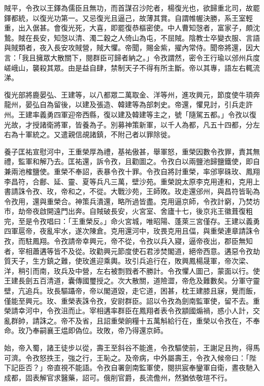 \begin{pinyinscope}
 賊平，令孜以王鐸為儒臣且無功，而首謀召沙陀者，楊復光也，欲歸重北司，故罷鐸都統，以復光功第一。又忌復光且逼己，故薄其賞。自謂帷幄決勝，系王室輕重，出入倨甚。會復光死，大喜，即罷復恭樞密使。中人曹知愨者，富家子，頗沈鷙。賊在長安，知愨以清、濁二穀之人倚山為屯，不屈賊。陰教士卒變衣服、言語與賊類者，夜入長安攻賊營，賊大懼。帝聞，賜金紫，擢內常侍。聞帝將還，因大言：「我且擁眾大散關下，閱群臣可歸者納之。」令孜謂然，密令王行瑜以邠州兵度嵯峨山，襲殺其眾。由是益自肆，禁制天子不得有所主斷。帝以其專，語左右輒流涕。



 復光部將鹿晏弘、王建等，以八都眾二萬取金、洋等州，進攻興元，節度使牛頊奔龍州，晏弘自為留後，以建及張造、韓建等為部刺史。帝還，懼見討，引兵走許州。王建率義勇四軍迎帝西縣，復以建及韓建等主之，號「隨駕五都。」令孜以復光故，才授諸衛將軍，皆養為子。別募神策新軍，以千人為都，凡五十四都，分左右為十軍統之。又遣親信覘諸鎮，不附己者以罪除徙。



 養子匡祐宣慰河中，王重榮厚為禮，基祐傲甚，舉軍怒，重榮因數令孜罪，責其無禮，監軍和解乃去。匡祐還，訴令孜，且勸圖之。令孜白以兩鹽池歸鹽鐵使，即自兼兩池榷鹽使。重榮不奉詔，表暴令孜十罪。令孜自將討重榮，率邠寧硃玫、鳳翔李昌符，合鄜、延、靈、夏等兵凡三萬，壁沙苑。重榮說太原李克用連和，克用上書請誅令孜、玫，帝和之，不從。大戰沙苑，王師敗。玫走還邠州，與昌符皆恥為令孜用，還與重榮合。神策兵潰還，略所過皆盡。克用逼京師，令孜計窮，乃焚坊市，劫帝夜啟開遠門出奔。自賊破長安，火宮室、舍廬十七，後京兆王徽葺復粗完，至是令孜唱曰：「王重榮反。」命火宮城，唯昭陽、蓬萊三宮僅存。王建以義勇四軍扈帝，夜亂牢水，遂次陳倉。克用還河中，玫畏克用且偪，與重榮連章請誅令孜，而駐鳳翔。令孜請帝幸興元，帝不從，令孜以兵入寢，逼帝夜出，郡臣無知者，宰相蕭遘等皆不及從。玫勸興元節度使石君涉焚閣道，絕帝西意。遘惡令孜劫質天子，生方鎮之難，使玫進迎乘輿。玫引兵追行在，敗興鳳楊晟軍，帝次梁、洋，稍引而南，玫兵及中營，左右被剽戮者不勝計。令孜懼人圖己，蒙面以行。使王建長劍五百清道，囊傳國璽授之。次大散關，道險澀，帝危及難數矣。分軍守靈壁，亢追兵。玫長驅躡帝，帝以閣道毀，走它道，困甚，枕王建膝且寐，覺而飯，僅能至興元。玫、重榮表誅令孜，安尉群臣。詔以令孜為劍南監軍使，留不去。重榮請幸河中，令孜沮而止。宰相遘率群臣在鳳翔者表令孜顓國煽禍，惑小人計，交亂群帥，請誅之。帝不及省，且詔重榮餉糧十五萬斛給行在，重榮以令孜在，不奉命。玫乃奉嗣襄王煴即偽位。玫敗，帝乃得還京師。



 始，帝入蜀，諸王徒步以從，壽王至斜谷不能進，令孜驅使前，王謝足且拘，得馬可濟。令孜怒抶王，強之行，王恥之。及帝病，中外屬壽王，令孜入候帝曰：「陛下記臣否？」帝直視不能語。令孜自署劍南監軍使，閱拱宸奉鑾軍自衛，晝夜馳入成都，固表解官求醫藥，詔可。俄削官爵，長流儋州，然猶依敬瑄不行。




\end{pinyinscope}

